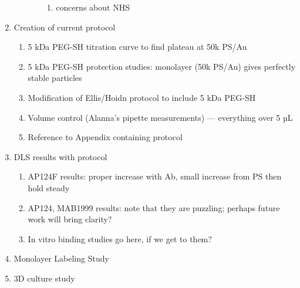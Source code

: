 \begin{enumerate}
\begin{enumerate}
\begin{enumerate}
\begin{enumerate}
\item concerns about NHS

\end{enumerate}

\end{enumerate}

\end{enumerate}

\item Creation of current protocol

\begin{enumerate}
\item 5 kDa PEG-SH titration curve to find plateau at 50k PS\slash Au

\item 5 kDa PEG-SH protection studies: monolayer (50k PS\slash Au) gives perfectly stable particles

\item Modification of Ellis\slash Hoidn protocol to include 5 kDa PEG-SH

\item Volume control (Alanna's pipette measurements) --- everything over 5 µL

\item Reference to Appendix containing protocol

\end{enumerate}

\item DLS results with protocol

\begin{enumerate}
\item AP124F results: proper increase with Ab, small increase from PS then hold steady

\item AP124, MAB1999 results: note that they are puzzling; perhaps future work will bring clarity?

\item In vitro binding studies go here, if we get to them?

\end{enumerate}

\item Monolayer Labeling Study

\item 3D culture study

\end{enumerate}
